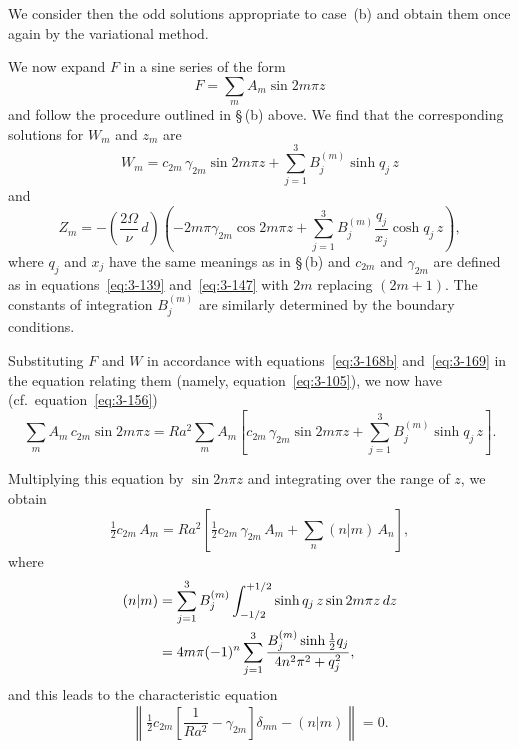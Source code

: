 We consider then the odd solutions appropriate to case~(b) and obtain them once again by the variational method.

We now expand $F$ in a sine series of the form
\begin{equation}\label{eq:3-168b}
F = \sum_m A_m\sin 2m\pi z
\end{equation}
and follow the procedure outlined in \S\,(b) above. We find that the corresponding solutions for $W_m$ and $z_m$ are
\begin{equation}\label{eq:3-169}
W_m = c_{2m}\,\gamma_{2m}\sin 2m\pi z + \sum_{j=1}^{3} B_j^{(m)}\sinh q_j\, z
\end{equation}
and
\begin{equation}\label{eq:3-170}
Z_m = -\left(\frac{2\Omega}{\nu}\,d\right)\!\left(-2m\pi\gamma_{2m}\cos 2m\pi z + \sum_{j=1}^{3} B_j^{(m)}\frac{q_j}{x_j}\cosh q_j\, z\right),
\end{equation}
where $q_j$ and $x_j$ have the same meanings as in \S\,(b) and $c_{2m}$ and $\gamma_{2m}$ are defined as in equations~\eqref{eq:3-139} and~\eqref{eq:3-147} with $2m$ replacing $(2m+1)$. The constants of integration $B_j^{(m)}$ are similarly determined by the boundary conditions.

Substituting $F$ and $W$ in accordance with equations~\eqref{eq:3-168b} and~\eqref{eq:3-169} in the equation relating them (namely, equation~\eqref{eq:3-105}), we now have (cf.\ equation~\eqref{eq:3-156})
\begin{equation}\label{eq:3-171}
\sum_m A_m\, c_{2m}\sin 2m\pi z = Ra^2\sum_m A_m\!\left[c_{2m}\,\gamma_{2m}\sin 2m\pi z + \sum_{j=1}^{3} B_j^{(m)}\sinh q_j\, z\right].
\end{equation}

Multiplying this equation by $\sin 2n\pi z$ and integrating over the range of $z$, we obtain
\begin{equation}\label{eq:3-172}
\tfrac{1}{2}c_{2m}\, A_m = Ra^2\!\left[\tfrac{1}{2}c_{2m}\,\gamma_{2m}\, A_m + \sum_n (n|m)\,A_n\right],
\end{equation}
where
\begin{align}
(n|m) &= \sum_{j=1}^{3} B_j^{(m)} \int_{-1/2}^{+1/2} \sinh q_j\, z\sin 2m\pi z\,dz \notag\\
&= 4m\pi(-1)^n \sum_{j=1}^{3} \frac{B_j^{(m)}\sinh\tfrac{1}{2}q_j}{4n^2\pi^2 + q_j^2}, \label{eq:3-173}
\end{align}
and this leads to the characteristic equation
\begin{equation}\label{eq:3-174}
\left\|\tfrac{1}{2}c_{2m}\!\left[\frac{1}{Ra^2} - \gamma_{2m}\right]\!\delta_{mn} - (n|m)\right\| = 0.
\end{equation}

